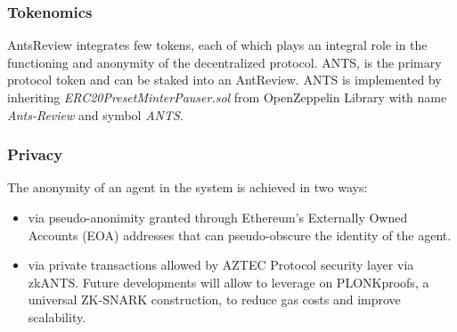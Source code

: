 \documentclass[runningheads]{llncs}
\begin{document}
\subsubsection{Tokenomics}
AntsReview integrates few tokens, each of which plays an integral role in the functioning and anonymity of the decentralized protocol.
\newline ANTS, is the primary protocol token and can be staked into an AntReview.
\newline ANTS is implemented by inheriting \emph{ERC20PresetMinterPauser.sol} from OpenZeppelin Library with name \emph{Ants-Review} and symbol \emph{ANTS}.

\subsubsection{Privacy}
The anonymity of an agent in the system is achieved in two ways:

\begin{itemize}
  \item via pseudo-anonimity granted through Ethereum's Externally Owned Accounts (EOA) addresses that can pseudo-obscure the identity of the agent.
  \item via private transactions allowed by AZTEC Protocol security layer via zkANTS. Future developments will allow to leverage on PLONK\cite{PLONK}proofs, a universal ZK-SNARK construction, to reduce gas costs and improve scalability.
\end{itemize}
\end{document}
